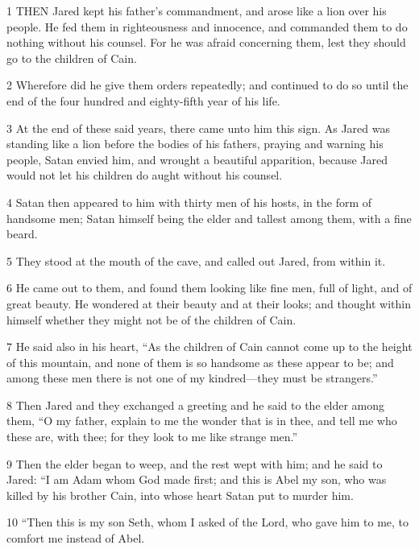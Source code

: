 \par 1 THEN Jared kept his father's commandment, and arose like a lion over his people. He fed them in righteousness and innocence, and commanded them to do nothing without his counsel. For he was afraid concerning them, lest they should go to the children of Cain.

\par 2 Wherefore did he give them orders repeatedly; and continued to do so until the end of the four hundred and eighty-fifth year of his life.

\par 3 At the end of these said years, there came unto him this sign. As Jared was standing like a lion before the bodies of his fathers, praying and warning his people, Satan envied him, and wrought a beautiful apparition, because Jared would not let his children do aught without his counsel.

\par 4 Satan then appeared to him with thirty men of his hosts, in the form of handsome men; Satan himself being the elder and tallest among them, with a fine beard.

\par 5 They stood at the mouth of the cave, and called out Jared, from within it.

\par 6 He came out to them, and found them looking like fine men, full of light, and of great beauty. He wondered at their beauty and at their looks; and thought within himself whether they might not be of the children of Cain.

\par 7 He said also in his heart, “As the children of Cain cannot come up to the height of this mountain, and none of them is so handsome as these appear to be; and among these men there is not one of my kindred—they must be strangers.”

\par 8 Then Jared and they exchanged a greeting and he said to the elder among them, “O my father, explain to me the wonder that is in thee, and tell me who these are, with thee; for they look to me like strange men.”

\par 9 Then the elder began to weep, and the rest wept with him; and he said to Jared: “I am Adam whom God made first; and this is Abel my son, who was killed by his brother Cain, into whose heart Satan put to murder him.

\par 10 “Then this is my son Seth, whom I asked of the Lord, who gave him to me, to comfort me instead of Abel.

